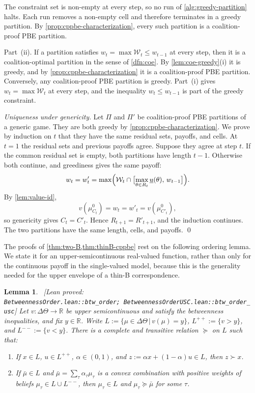 \documentclass[11pt]{article}
\newtheorem{lemma}{Lemma}
\newcommand{\sep}{\,|\,}
\newcommand{\W}{\mathcal{W}}
\newcommand{\leanproved}[1]{{\footnotesize\textsf{\textcolor{green!55!black}{[Lean proved: \texttt{#1}]}}}}
\begin{document}
The constraint set is non-empty at every step, so no run of \cref{alg:greedy-partition} halts. Each run removes a non-empty cell and therefore terminates in a greedy partition. By \cref{prop:cppbe-characterization}, every such partition is a coalition-proof PBE partition.

Part~(ii). If a partition satisfies $w_t=\max\W_t\leq w_{t-1}$ at every step, then it is a coalition-optimal partition in the sense of \cref{dfn:coe}. By \cref{lem:coe-greedy}(i) it is greedy, and by \cref{prop:cppbe-characterization} it is a coalition-proof PBE partition. Conversely, any coalition-proof PBE partition is greedy. Part~(i) gives $w_t=\max\W_t$ at every step, and the inequality $w_t\leq w_{t-1}$ is part of the greedy constraint.

\emph{Uniqueness under genericity.} Let $\Pi$ and $\Pi'$ be coalition-proof PBE partitions of a generic game. They are both greedy by \cref{prop:cppbe-characterization}. We prove by induction on $t$ that they have the same residual sets, payoffs, and cells. At $t=1$ the residual sets and previous payoffs agree. Suppose they agree at step $t$. If the common residual set is empty, both partitions have length $t-1$. Otherwise both continue, and greediness gives the same payoff:
\[
    w_t=w'_t
    =
    \max\Bigl(\W_t\cap\bigl[\max_{\theta\in R_t}\underline u(\theta),\,w_{t-1}\bigr]\Bigr).
\]
By \cref{lem:value-id},
\[
    v(\mu^0_{C_t})=w_t=w'_t=v(\mu^0_{C'_t}),
\]
so genericity gives $C_t=C'_t$. Hence $R_{t+1}=R'_{t+1}$, and the induction continues. The two partitions have the same length, cells, and payoffs.
\qed

The proofs of \cref{thm:two-B,thm:thinB-cppbe} rest on the following ordering lemma. We state it for an upper-semicontinuous real-valued function, rather than only for the continuous payoff in the single-valued model, because this is the generality needed for the upper envelope of a thin-B correspondence.

\begin{lemma}\label{lem:btw-order}\ \leanproved{BetweennessOrder.lean::btw\_order;\ BetweennessOrderUSC.lean::btw\_order\_usc}
    Let $v:\Delta\Theta\to\mathbb{R}$ be upper semicontinuous and satisfy the betweenness inequalities, and fix $y\in\mathbb{R}$. Write $L:=\{\mu\in\Delta\Theta\sep v(\mu)=y\}$, $L^{++}:=\{v>y\}$, and $L^{--}:=\{v<y\}$. There is a complete and transitive relation $\succeq$ on $L$ such that:
    \begin{enumerate}
        \item[(i)] If $x\in L$, $u\in L^{++}$, $\alpha\in(0,1)$, and $z:=\alpha x+(1-\alpha)u\in L$, then $z\succ x$.
        \item[(ii)] If $\bar\mu\in L$ and $\bar\mu=\sum_\tau\alpha_\tau\mu_\tau$ is a convex combination with positive weights of beliefs $\mu_\tau\in L\cup L^{--}$, then $\mu_\tau\in L$ and $\mu_\tau\succeq\bar\mu$ for some $\tau$.
    \end{enumerate}
\end{lemma}
\end{document}
